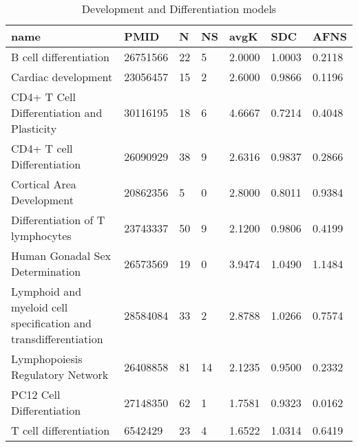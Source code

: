 \begin{table}
\caption{Development and Differentiation models}
\label{tab:Development_and_Differentiation}
\begin{tabular}{|p{180pt}||p{40pt}|p{25pt}|p{25pt}|p{40pt}|p{25pt}|p{25pt}|}
\toprule
name & PMID & N & NS & avgK & SDC & AFNS \\
\midrule
B cell differentiation & 26751566 & 22 & 5 & 2.0000 & 1.0003 & 0.2118 \\
Cardiac development & 23056457 & 15 & 2 & 2.6000 & 0.9866 & 0.1196 \\
CD4+ T Cell Differentiation and Plasticity & 30116195 & 18 & 6 & 4.6667 & 0.7214 & 0.4048 \\
CD4+ T cell Differentiation & 26090929 & 38 & 9 & 2.6316 & 0.9837 & 0.2866 \\
Cortical Area Development & 20862356 & 5 & 0 & 2.8000 & 0.8011 & 0.9384 \\
Differentiation of T lymphocytes & 23743337 & 50 & 9 & 2.1200 & 0.9806 & 0.4199 \\
Human Gonadal Sex Determination & 26573569 & 19 & 0 & 3.9474 & 1.0490 & 1.1484 \\
Lymphoid and myeloid cell specification and transdifferentiation & 28584084 & 33 & 2 & 2.8788 & 1.0266 & 0.7574 \\
Lymphopoiesis Regulatory Network & 26408858 & 81 & 14 & 2.1235 & 0.9500 & 0.2332 \\
PC12 Cell Differentiation & 27148350 & 62 & 1 & 1.7581 & 0.9323 & 0.0162 \\
T cell differentiation & 6542429 & 23 & 4 & 1.6522 & 1.0314 & 0.6419 \\
\bottomrule
\end{tabular}
\end{table}
